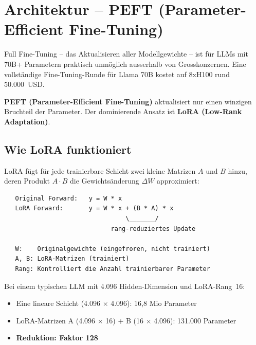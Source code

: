 
\section{Architektur -- PEFT (Parameter-Efficient Fine-Tuning)}

Full Fine-Tuning -- das Aktualisieren aller Modellgewichte -- ist für LLMs mit 70B+ Parametern praktisch unmöglich ausserhalb von Grosskonzernen. Eine vollständige Fine-Tuning-Runde für Llama 70B kostet auf 8xH100 rund 50.000~USD.

\textbf{PEFT (Parameter-Efficient Fine-Tuning)} aktualisiert nur einen winzigen Bruchteil der Parameter. Der dominierende Ansatz ist \textbf{LoRA (Low-Rank Adaptation)}.

\subsection{Wie LoRA funktioniert}

LoRA fügt für jede trainierbare Schicht zwei kleine Matrizen $A$ und $B$ hinzu, deren Produkt $A \cdot B$ die Gewichtsänderung $\Delta W$ approximiert:

\begin{verbatim}
   Original Forward:   y = W * x
   LoRA Forward:       y = W * x + (B * A) * x
                                 \_______/
                             rang-reduziertes Update

   W:    Originalgewichte (eingefroren, nicht trainiert)
   A, B: LoRA-Matrizen (trainiert)
   Rang: Kontrolliert die Anzahl trainierbarer Parameter
\end{verbatim}

Bei einem typischen LLM mit 4.096 Hidden-Dimension und LoRA-Rang~16:

\begin{itemize}[leftmargin=*]
    \item Eine lineare Schicht (4.096 $\times$ 4.096): 16,8 Mio Parameter
    \item LoRA-Matrizen A (4.096 $\times$ 16) + B (16 $\times$ 4.096): 131.000 Parameter
    \item \textbf{Reduktion: Faktor 128}
\end{itemize}

